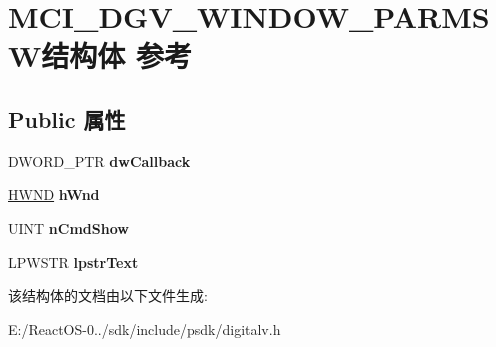 \hypertarget{struct_m_c_i___d_g_v___w_i_n_d_o_w___p_a_r_m_s_w}{}\section{M\+C\+I\+\_\+\+D\+G\+V\+\_\+\+W\+I\+N\+D\+O\+W\+\_\+\+P\+A\+R\+M\+S\+W结构体 参考}
\label{struct_m_c_i___d_g_v___w_i_n_d_o_w___p_a_r_m_s_w}
\subsection*{Public 属性}
\begin{DoxyCompactItemize}
\item 
\mbox{\label{struct_m_c_i___d_g_v___w_i_n_d_o_w___p_a_r_m_s_w_a71392cdde54403b55aa580db0cc0505a}} 
D\+W\+O\+R\+D\+\_\+\+P\+TR {\bfseries dw\+Callback}
\item 
\mbox{\label{struct_m_c_i___d_g_v___w_i_n_d_o_w___p_a_r_m_s_w_a42645c1842c0f97ce20827e5048c1b07}} 
\hyperlink{interfacevoid}{H\+W\+ND} {\bfseries h\+Wnd}
\item 
\mbox{\label{struct_m_c_i___d_g_v___w_i_n_d_o_w___p_a_r_m_s_w_a3e97f5c3dc539d55adfc613644ca064b}} 
U\+I\+NT {\bfseries n\+Cmd\+Show}
\item 
\mbox{\label{struct_m_c_i___d_g_v___w_i_n_d_o_w___p_a_r_m_s_w_a53d97eb5c7a3675cd1442d23e4d66302}} 
L\+P\+W\+S\+TR {\bfseries lpstr\+Text}
\end{DoxyCompactItemize}


该结构体的文档由以下文件生成\+:\begin{DoxyCompactItemize}
\item 
E\+:/\+React\+O\+S-\/0../sdk/include/psdk/digitalv.\+h\end{DoxyCompactItemize}
